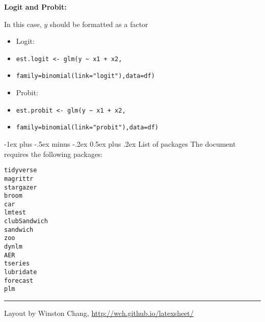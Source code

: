 \documentclass[10pt,landscape]{article}
\makeatletter
\renewcommand{\section}{\@startsection{section}{1}{0mm}%
                                {-1ex plus -.5ex minus -.2ex}%
                                {0.5ex plus .2ex}%
                                {\normalfont\large\bfseries}}
\makeatother
\begin{document}
\begin{multicols}{3}
\textbf{Logit and Probit:}\\

\smallskip{}

In this case, $y$ should be formatted as a factor

\smallskip{}

\begin{itemize}
    \item Logit:
    \item[] \verb!est.logit <- glm(y ~ x1 + x2,!
    \item[] \verb!family=binomial(link="logit"),data=df)!
    \item Probit:
    \item[] \verb!est.probit <- glm(y ~ x1 + x2,!
    \item[] \verb!family=binomial(link="probit"),data=df)!
\end{itemize}





\section{List of packages}
The document requires the following packages:

\smallskip{}

\begin{multicols}{4}
\verb!tidyverse!  \\
\verb!magrittr!  \\
\verb!stargazer!  \\
\verb!broom!  \\
\verb!car!  \\
\verb!lmtest!  \\
\verb!clubSandwich!  \\
\verb!sandwich!  \\
\verb!zoo!  \\
\verb!dynlm!  \\
\verb!AER!  \\
\verb!tseries!  \\
\verb!lubridate!  \\
\verb!forecast!  \\
\verb!plm!  \\
\end{multicols}

\rule{0.3\linewidth}{0.25pt}
\scriptsize

Layout by Winston Chang, \href{http://wch.github.io/latexsheet/}{http://wch.github.io/latexsheet/}


\end{multicols}
\end{document}

